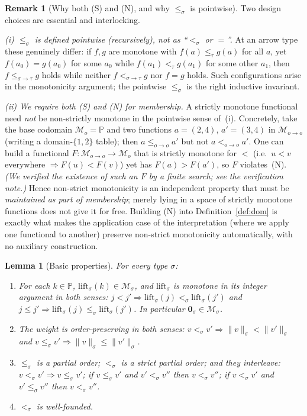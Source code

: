 \documentclass{amsart}
\newtheorem{lemma}{Lemma}
\theoremstyle{definition}
\newtheorem{remark}{Remark}
\begin{document}
\begin{remark}[Why both (S) and (N), and why $\le_\sigma$ is pointwise]\label{rem:leq}
Two design choices are essential and interlocking.

\emph{(i) $\le_\sigma$ is defined pointwise (recursively), not as ``$<_\sigma$ or $=$''.}
At an arrow type these genuinely differ: if $f,g$ are monotone with $f(a)\le_\tau g(a)$ for
all $a$, yet $f(a_0)=g(a_0)$ for some $a_0$ while $f(a_1)<_\tau g(a_1)$ for some other $a_1$,
then $f\le_{\sigma\to\tau}g$ holds while neither $f<_{\sigma\to\tau}g$ nor $f=g$ holds. Such
configurations arise in the monotonicity argument; the pointwise $\le_\sigma$ is the right
inductive invariant.

\emph{(ii) We require both (S) \emph{and} (N) for membership.} A strictly monotone functional
need \emph{not} be non-strictly monotone in the pointwise sense of~(i). Concretely, take the
base codomain $\mathcal M_o=\mathbb P$ and two functions $a=(2,4)$, $a'=(3,4)$ in
$\mathcal M_{o\to o}$ (writing a domain-$\{1,2\}$ table); then $a\le_{o\to o}a'$ but not
$a<_{o\to o}a'$. One can build a functional $F:\mathcal M_{o\to o}\to\mathcal M_o$ that is
strictly monotone for $<$ (i.e.\ $u<v$ everywhere $\Rightarrow F(u)<F(v)$) yet has
$F(a)>F(a')$, so $F$ violates~(N). \emph{(We verified the existence of such an $F$ by a finite
search; see the verification note.)} Hence non-strict monotonicity is an independent property
that must be \emph{maintained as part of membership}; merely lying in a space of strictly
monotone functions does not give it for free. Building (N) into Definition~\ref{def:dom} is
exactly what makes the application case of the interpretation (where we apply one functional
to another) preserve non-strict monotonicity automatically, with no auxiliary construction.
\end{remark}

\begin{lemma}[Basic properties]\label{lem:basic}
For every type $\sigma$:
\begin{enumerate}
\item[(a)] For each $k\in\mathbb P$, $\mathrm{lift}_\sigma(k)\in\mathcal M_\sigma$, and
  $\mathrm{lift}_\sigma$ is monotone in its integer argument in both senses:
  $j<j'\Rightarrow\mathrm{lift}_\sigma(j)<_\sigma\mathrm{lift}_\sigma(j')$ and
  $j\le j'\Rightarrow\mathrm{lift}_\sigma(j)\le_\sigma\mathrm{lift}_\sigma(j')$.
  In particular $\mathbf 0_\sigma\in\mathcal M_\sigma$.
\item[(b)] The weight is order-preserving in both senses:
  $v<_\sigma v'\Rightarrow\|v\|_\sigma<\|v'\|_\sigma$ and
  $v\le_\sigma v'\Rightarrow\|v\|_\sigma\le\|v'\|_\sigma$.
\item[(c)] $\le_\sigma$ is a partial order; $<_\sigma$ is a strict partial order; and they
  interleave: $v<_\sigma v'\Rightarrow v\le_\sigma v'$; if $v\le_\sigma v'$ and
  $v'<_\sigma v''$ then $v<_\sigma v''$; if $v<_\sigma v'$ and $v'\le_\sigma v''$ then
  $v<_\sigma v''$.
\item[(d)] $<_\sigma$ is well-founded.
\end{enumerate}
\end{lemma}
\end{document}
